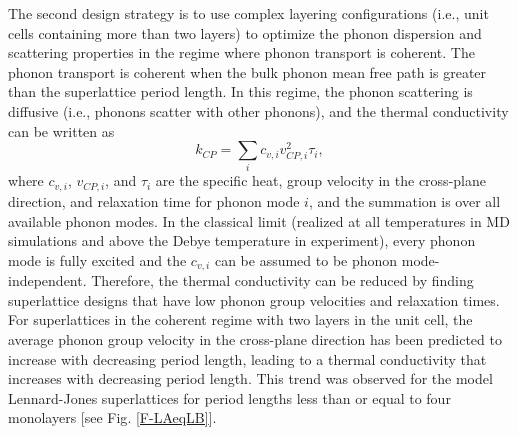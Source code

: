 \documentclass[letterpaper,12pt]{article}
\begin{document}
The second design strategy is to use complex layering configurations
(i.e., unit cells containing more than two layers) to optimize the
phonon dispersion and scattering properties in the regime where
phonon transport is coherent. The phonon transport is coherent when
the bulk phonon mean free path is greater than the superlattice
period length. In this regime, the phonon scattering is diffusive
(i.e., phonons scatter with other phonons), and the thermal
conductivity can be written as
\begin{equation}
k_{CP} = \sum_i c_{v,i} v_{CP,i}^2 \tau_i, \label{E-kmodes}
\end{equation}
where $c_{v,i}$, $v_{CP,i}$, and $\tau_i$ are the specific heat,
group velocity in the cross-plane direction, and relaxation time for
phonon mode $i$, and the summation is over all available phonon
modes. In the classical limit (realized at all temperatures in MD
simulations and above the Debye temperature in experiment), every
phonon mode is fully excited and the $c_{v,i}$ can be assumed to be
phonon mode-independent. Therefore, the thermal conductivity can be
reduced by finding superlattice designs that have low phonon group
velocities and relaxation times. For superlattices in the coherent
regime with two layers in the unit cell, the average phonon group
velocity in the cross-plane direction has been predicted to increase
with decreasing period
length,\cite{kiselev2000,tamura1999,yang2001,bies2000,broido2004}
leading to a thermal conductivity that increases with decreasing
period length. This trend was observed for the model Lennard-Jones
superlattices for period lengths less than or equal to four
monolayers [see Fig$.$ \ref{F-LAeqLB}].

\end{document}
